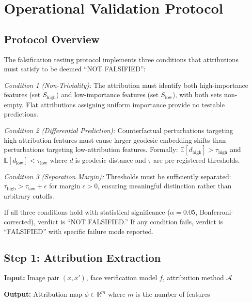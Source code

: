 
\section{Operational Validation Protocol}
\label{sec:protocol}

\subsection{Protocol Overview}

The falsification testing protocol implements three conditions that attributions must satisfy to be deemed ``NOT FALSIFIED'':

\textit{Condition 1 (Non-Triviality):} The attribution must identify both high-importance features (set $S_{\text{high}}$) and low-importance features (set $S_{\text{low}}$), with both sets non-empty. Flat attributions assigning uniform importance provide no testable predictions.

\textit{Condition 2 (Differential Prediction):} Counterfactual perturbations targeting high-attribution features must cause larger geodesic embedding shifts than perturbations targeting low-attribution features. Formally: $\mathbb{E}[d_{\text{high}}] > \tau_{\text{high}}$ and $\mathbb{E}[d_{\text{low}}] < \tau_{\text{low}}$ where $d$ is geodesic distance and $\tau$ are pre-registered thresholds.

\textit{Condition 3 (Separation Margin):} Thresholds must be sufficiently separated: $\tau_{\text{high}} > \tau_{\text{low}} + \epsilon$ for margin $\epsilon > 0$, ensuring meaningful distinction rather than arbitrary cutoffs.

If all three conditions hold with statistical significance ($\alpha = 0.05$, Bonferroni-corrected), verdict is ``NOT FALSIFIED.'' If any condition fails, verdict is ``FALSIFIED'' with specific failure mode reported.

\subsection{Step 1: Attribution Extraction}

\textbf{Input:} Image pair $(x, x')$, face verification model $f$, attribution method $\mathcal{A}$

\textbf{Output:} Attribution map $\phi \in \mathbb{R}^m$ where $m$ is the number of features

